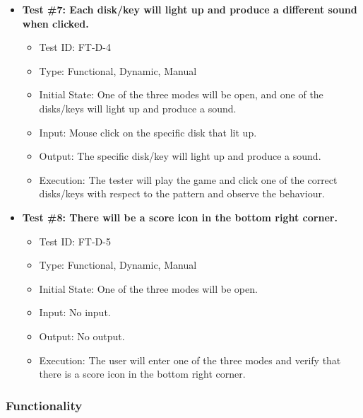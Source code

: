 \documentclass[12pt, titlepage]{article}
\begin{document}
\begin{itemize}
\item \textbf{Test \#7: Each disk/key will light up and produce a different sound when clicked.}
\begin{itemize}
\item Test ID: FT-D-4
\item Type: Functional, Dynamic, Manual 		
\item Initial State: One of the three modes will be open, and one of the disks/keys will light up and produce a sound.			
\item Input: Mouse click on the specific disk that lit up. 					
\item Output: The specific disk/key will light up and produce a sound.					
\item Execution: The tester will play the game and click one of the correct disks/keys with respect to the pattern and observe the behaviour.
\end{itemize}

\item \textbf{Test \#8: There will be a score icon in the bottom right corner.}
\begin{itemize}
\item Test ID: FT-D-5
\item Type: Functional, Dynamic, Manual 		
\item Initial State: One of the three modes will be open. 					
\item Input: No input.					
\item Output: No output. 					
\item Execution: The user will enter one of the three modes and verify that there is a score icon in the bottom right corner.  
\end{itemize}

\end{itemize}

\subsubsection{Functionality}
\end{document}
